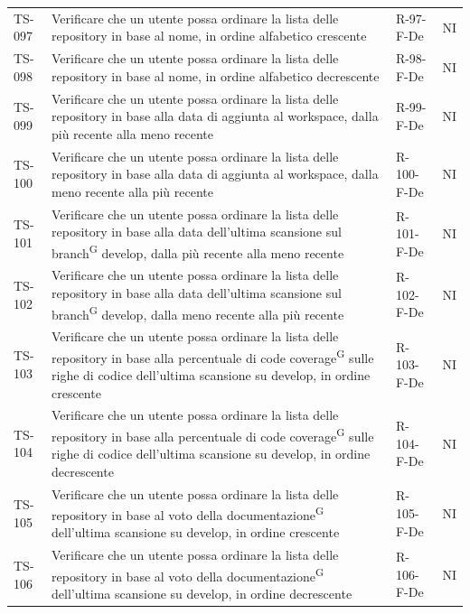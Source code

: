 \documentclass[a4paper, 11pt]{article}
\begin{document}
\begin{longtable}{>{\centering\arraybackslash}m{1.4cm} >{\raggedright\arraybackslash}p{7.2cm} >{\centering\arraybackslash}m{2.5cm} >{\centering\arraybackslash}m{2.2cm}}
TS-097 & Verificare che un utente possa ordinare la lista delle repository in base al nome, in ordine alfabetico crescente & R-97-F-De & NI \\
TS-098 & Verificare che un utente possa ordinare la lista delle repository in base al nome, in ordine alfabetico decrescente & R-98-F-De & NI \\
TS-099 & Verificare che un utente possa ordinare la lista delle repository in base alla data di aggiunta al workspace, dalla più recente alla meno recente & R-99-F-De & NI \\
TS-100 & Verificare che un utente possa ordinare la lista delle repository in base alla data di aggiunta al workspace, dalla meno recente alla più recente & R-100-F-De & NI \\
TS-101 & Verificare che un utente possa ordinare la lista delle repository in base alla data dell'ultima scansione sul branch\textsuperscript{G} develop, dalla più recente alla meno recente & R-101-F-De & NI \\
TS-102 & Verificare che un utente possa ordinare la lista delle repository in base alla data dell'ultima scansione sul branch\textsuperscript{G} develop, dalla meno recente alla più recente & R-102-F-De & NI \\
TS-103 & Verificare che un utente possa ordinare la lista delle repository in base alla percentuale di code coverage\textsuperscript{G} sulle righe di codice dell'ultima scansione su develop, in ordine crescente & R-103-F-De & NI \\
TS-104 & Verificare che un utente possa ordinare la lista delle repository in base alla percentuale di code coverage\textsuperscript{G} sulle righe di codice dell'ultima scansione su develop, in ordine decrescente & R-104-F-De & NI \\
TS-105 & Verificare che un utente possa ordinare la lista delle repository in base al voto della documentazione\textsuperscript{G} dell'ultima scansione su develop, in ordine crescente & R-105-F-De & NI \\
TS-106 & Verificare che un utente possa ordinare la lista delle repository in base al voto della documentazione\textsuperscript{G} dell'ultima scansione su develop, in ordine decrescente & R-106-F-De & NI \\


\end{longtable}
\end{document}
